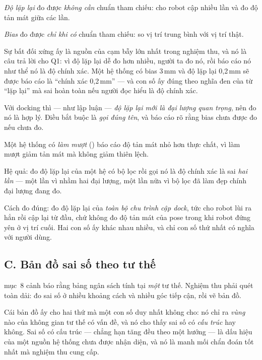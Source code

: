 \documentclass[../../marker.tex]{subfiles}
\begin{document}
\emph{Độ lặp lại} đo được \emph{không cần} chuẩn tham chiếu: cho robot cập nhiều lần và đo độ tản mát giữa các lần.

\emph{Bias} đo được \emph{chỉ khi có} chuẩn tham chiếu: so vị trí trung bình với vị trí thật.

Sự bất đối xứng ấy là nguồn của cạm bẫy lớn nhất trong nghiệm thu, và nó là câu trả lời cho Q1: vì độ lặp lại dễ đo hơn nhiều, người ta đo nó, rồi báo cáo nó như thể nó là độ chính xác. Một hệ thống có bias 3\,mm và độ lặp lại 0,2\,mm sẽ được báo cáo là ``chính xác 0,2\,mm'' --- và con số ấy đúng theo nghĩa đen của từ ``lặp lại'' mà sai hoàn toàn nếu người đọc hiểu là độ chính xác.

Với docking thì --- như  lập luận --- \emph{độ lặp lại mới là đại lượng quan trọng}, nên đo nó là hợp lý. Điều bắt buộc là \emph{gọi đúng tên}, và báo cáo rõ rằng bias chưa được đo nếu chưa đo.

\begin{cambay}
Một hệ thống có \emph{làm mượt} () báo cáo độ tản mát nhỏ hơn thực chất, vì làm mượt giảm tản mát mà không giảm thiên lệch.

Hệ quả: đo độ lặp lại của một hệ có bộ lọc rồi gọi nó là độ chính xác là sai \emph{hai lần} --- một lần vì nhầm hai đại lượng, một lần nữa vì bộ lọc đã làm đẹp chính đại lượng đang đo.

Cách đo đúng: đo độ lặp lại của \emph{toàn bộ chu trình cập dock}, tức cho robot lùi ra hẳn rồi cập lại từ đầu, chứ không đo độ tản mát của pose trong khi robot đứng yên ở vị trí cuối. Hai con số ấy khác nhau nhiều, và chỉ con số thứ nhất có nghĩa với người dùng.
\end{cambay}

\subsection{C. Bản đồ sai số theo tư thế}

 mục~8 cảnh báo rằng bảng ngân sách tính tại \emph{một} tư thế. Nghiệm thu phải quét toàn dải: đo sai số ở nhiều khoảng cách và nhiều góc tiếp cận, rồi vẽ bản đồ.

Cái bản đồ ấy cho hai thứ mà một con số duy nhất không cho: nó chỉ ra \emph{vùng} nào của không gian tư thế có vấn đề, và nó cho thấy sai số có \emph{cấu trúc} hay không. Sai số có cấu trúc --- chẳng hạn tăng đều theo một hướng --- là dấu hiệu của một nguồn hệ thống chưa được nhận diện, và nó là manh mối chẩn đoán tốt nhất mà nghiệm thu cung cấp.
\end{document}
